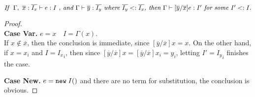 \begin{lemma}~\label{lemma1}
$\textit{If } \ \judgeewf {\Gamma, \ \overline{x}:\overline{I_x}} { e : I } \textit{ , and }
\judgeewf {\Gamma} {\overline{y}:\overline{I_y}} \textit{ where } \overline{I_y} \subtype \overline{I_x}
\textit{, then } \judgeewf {\Gamma} {[\overline{y}/\overline{x}]e : I'} \textit{ for some } I' \subtype I.
$

\begin{proof}~\\
\noindent \textbf{Case Var.}
$ e = x \quad I = \Gamma(x) $. \\
If $x \notin \overline{x}$, then the conclusion is immediate, since $[\overline{y}/\overline{x}]x = x$.
On the other hand, if $x = x_i$ and $I = {I_x}_i$, then since $[\overline{y}/\overline{x}]x = [\overline{y}/\overline{x}]x_i = y_i$,
letting $I' = {I_y}_i$ finishes the case.

\noindent \textbf{Case New.}
$e = \texttt{new} \; I()$ and there are no term for substitution, the conclusion is obvious.

\begin{comment}
\noindent \textbf{Case Invk.}
$ e = e_0.m(\overline{e}) \quad
  \judgeewf {\Gamma, \overline{x}:\overline{I_x}} {e_0 : I_0} $
$$ mtype(m, I_0) = \overline{I_e} \rightarrow J $$
$$ \judgeewf {\Gamma, \overline{x}:\overline{I_x}} {\overline{e}:\overline{I}} \quad
    \overline{I} \subtype \overline{I_e} $$
By induction hypothesis, there are some $I_0'$ and $\overline{I_e'}$ such that
    $$ \judgeewf {\Gamma} {[\overline{y}/\overline{x}]e_0 : I_0'} \quad 
        I_0' \subtype I_0 $$
    $$ \judgeewf {\Gamma} {[\overline{y}/\overline{x}]\overline{e} : \overline{I_e'}} \quad  
        \overline{I_e'} \subtype \overline{I}$$    
By lemma~\ref{lemma2}, 
    $mtype(m, I_0') = \overline{I_e} \rightarrow J$.
    
\noindent Then $\overline{I_e'} \subtype \overline{I_e}$ by the transitivity of $\subtype$.
Therefore, by the rule \textsc{(T-Invk)}, 
    $\judgeewf {\Gamma} {[\overline{y}/\overline{x}]e_0.m([\overline{y}/\overline{x}]\overline{e}) : J}$.

\noindent \textbf{Case PathInvk.}
$ e = e_0.I::m(\overline{e}) $ and proof is similar as case Var.

\noindent \textbf{Case SuperInvk.}
$ e = \kwsuper.I::m(\overline{e}) $ \\
Suppose $\judgeewf {\Gamma} {\kwthis : I_0}$, the following proof should be similar as case Var.
\end{comment}


\end{proof}
\end{lemma}
